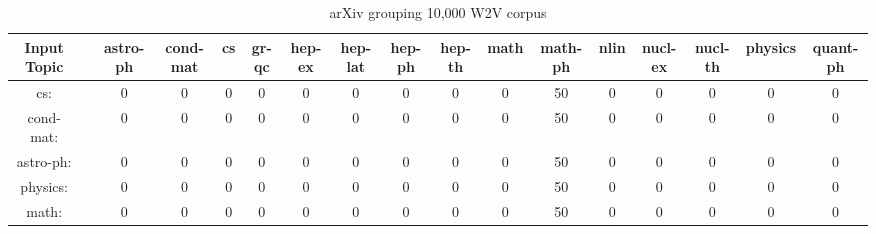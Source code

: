 \begin{sidewaystable}[h]
    \begin{tabular}{|c c c c c c c c c c c c c c c c c|}
         \hline
         Input Topic & & astro-ph & cond-mat & cs & gr-qc & hep-ex &hep-lat & hep-ph & hep-th & math & math-ph & nlin & nucl-ex & nucl-th & physics & quant-ph \\ [0.5ex]
         \hline\hline
         cs: & & 0 & 0 & 0 & 0 & 0 & 0 & 0 & 0 & 0 & 50 & 0 & 0 & 0 & 0 & 0 \\
         cond-mat: & & 0 & 0 & 0 & 0 & 0 & 0 & 0 & 0 & 0 & 50 & 0 & 0 & 0 & 0 & 0\\
         astro-ph: & & 0 & 0 & 0 & 0 & 0 & 0 & 0 & 0 & 0 & 50 & 0 & 0 & 0 & 0 & 0 \\
         physics: & & 0 & 0 & 0 & 0 & 0 & 0 & 0 & 0 & 0 & 50 & 0 & 0 & 0 & 0 & 0 \\
         math: & & 0 & 0 & 0 & 0 & 0 & 0 & 0 & 0 & 0 & 50 & 0 & 0 & 0 & 0 & 0 \\ [1ex]
         \hline
    \end{tabular}
    \caption{arXiv grouping 10,000 W2V corpus}
    \label{table:arxiv10000w2v}
\end{sidewaystable}
